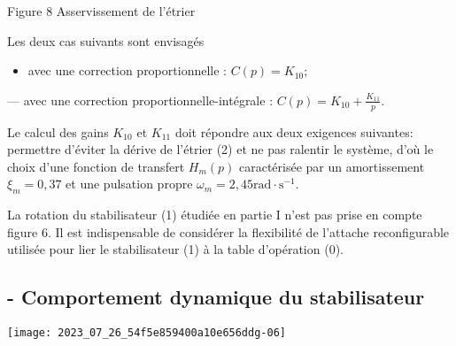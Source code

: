 Figure 8 Asservissement de l'étrier

Les deux cas suivants sont envisagés

\begin{itemize}
  \item avec une correction proportionnelle : $C(p)=K_{10}$;
\end{itemize}

— avec une correction proportionnelle-intégrale : $C(p)=K_{10}+\frac{K_{11}}{p}$.



Le calcul des gains $K_{10}$ et $K_{11}$ doit répondre aux deux exigences suivantes: permettre d'éviter la dérive de l'étrier (2) et ne pas ralentir le système, d'où le choix d'une fonction de transfert $H_{m}(p)$ caractérisée par un amortissement $\xi_{m}=0,37$ et une pulsation propre $\omega_{m}=2,45 \mathrm{rad} \cdot \mathrm{s}^{-1}$.


La rotation du stabilisateur (1) étudiée en partie I n'est pas prise en compte figure 6. Il est indispensable de considérer la flexibilité de l'attache reconfigurable utilisée pour lier le stabilisateur (1) à la table d'opération (0).

\subsection{\label{sec:II.C} - Comportement dynamique du stabilisateur}
\begin{center}
\texttt{[image: 2023\_07\_26\_54f5e859400a10e656ddg-06]}
\end{center}

